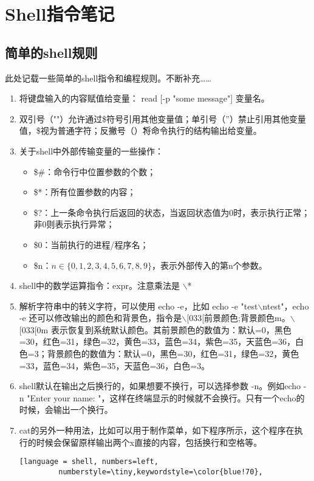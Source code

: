 \section{Shell指令笔记}

\subsection{简单的shell规则}
此处记载一些简单的shell指令和编程规则。不断补充……
\begin{enumerate}
  \item 将键盘输入的内容赋值给变量： read [-p "some message"] 变量名。
  \item 双引号（""）允许通过\$符号引用其他变量值；单引号（''）禁止引用其他变量值，\$视为普通字符；反撇号（\`\`）将命令执行的结构输出给变量。
  \item 关于shell中外部传输变量的一些操作：
    \begin{itemize}
      \item \$\#：命令行中位置参数的个数；
      \item \$*：所有位置参数的内容；
      \item \$?：上一条命令执行后返回的状态，当返回状态值为0时，表示执行正常；非0则表示执行异常；
      \item \$0：当前执行的进程/程序名；
      \item \$n：$n\in\{0,1,2,3,4,5,6,7,8,9\}$，表示外部传入的第n个参数。
    \end{itemize}
  \item shell中的数学运算指令：expr。注意乘法是 $\backslash$*
  \item 解析字符串中的转义字符，可以使用 echo -e，比如 echo -e "test$\backslash$ntest"，echo -e 还可以修改输出的颜色和背景色，指令是$\backslash$[033[前景颜色;背景颜色m。$\backslash$[033[0m 表示恢复到系统默认颜色。其前景颜色的数值为：默认=0，黑色=30，红色=31，绿色=32，黄色=33，蓝色=34，紫色=35，天蓝色=36，白色=3；背景颜色的数值为：默认=0，黑色=30，红色=31，绿色=32，黄色=33，蓝色=34，紫色=35，天蓝色=36，白色=3。
  \item shell默认在输出之后换行的，如果想要不换行，可以选择参数 -n。例如echo -n "Enter your name: "，这样在终端显示的时候就不会换行。只有一个echo的时候，会输出一个换行。
  \item cat的另外一种用法，比如可以用于制作菜单，如下程序所示，这个程序在执行的时候会保留原样输出两个x直接的内容，包括换行和空格等。
    \begin{lstlisting}[language = shell, numbers=left, 
         numberstyle=\tiny,keywordstyle=\color{blue!70},

\end{lstlisting}
\end{enumerate}
